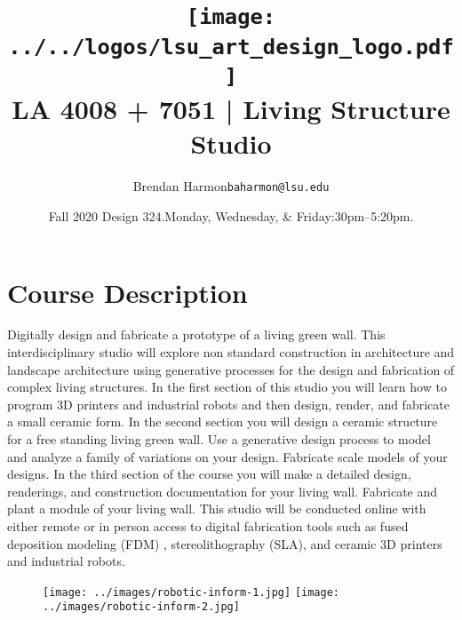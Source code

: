 \documentclass[11pt,article,oneside]{memoir}
\makeatletter
\def\myauthor{Author}
\def\mytitle{Title}
\def\myemail{baharmon@lsu.edu}
\def\myauthor{Brendan Harmon}
\def\mytitle{ \texttt{[image: ../../logos/lsu\_art\_design\_logo.pdf]} \\[0.1cm] {\normalfont \normalsize LA 4008 + 7051 |} \Large Living Structure Studio}
\newcommand{\globalcolor}[1]{%
  \color{#1}\global\let\default@color\current@color
}
\makeatother
\begin{document}
\setlength\bibitemsep{0.5em}

\setmainfont{Lato Regular}
\setmonofont[Scale=0.8]{IBM Plex Mono}

\def\ind{\hangindent=1 true cm\hangafter=1 \noindent}
\def\labelitemi{$\cdot$}

\title{\LARGE \mytitle}
\author{\Large\myauthor \newline \footnotesize\texttt{\noindent\myemail}}
\date{Fall 2020 Design 324.\newline Monday, Wednesday, \& Friday:30pm--5:20pm.}
\published{\,}


\globalcolor{black}
\vspace*{-10em}
\maketitle

\section{Course Description}

Digitally design and fabricate a prototype of a living green wall. 
This interdisciplinary studio will explore 
non standard construction 
in architecture and landscape architecture
using generative processes 
for the design and fabrication 
of complex living structures. 
In the first section of this studio you will 
learn how to program 3D printers and industrial robots 
and then design, render, and fabricate 
a small ceramic form.  
In the second section you will design 
a ceramic structure for a free standing living green wall.
Use a generative design process to model 
and analyze a family of variations on your design.
Fabricate scale models of your designs.  
In the third section of the course 
you will make a detailed design, renderings,  
and construction documentation
for your living wall. 
Fabricate and plant a module of your living wall.
This studio will be conducted online 
with either remote or in person access 
to digital fabrication tools such as 
fused deposition modeling (FDM) ,
stereolithography (SLA), and
ceramic 3D printers
and industrial robots. \\

\begin{figure}[h!]
\center
\texttt{[image: ../images/robotic-inform-1.jpg]}
\texttt{[image: ../images/robotic-inform-2.jpg]}
\end{figure}
\end{document}

